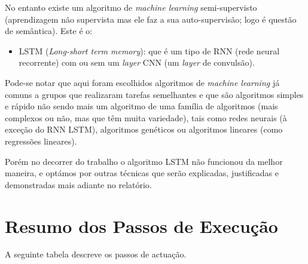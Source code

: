 No entanto existe um algoritmo de \textit{machine learning} semi-supervisto (aprendizagem não supervista mas ele faz a sua auto-supervisão; logo é questão de semântica).
Este é o:
\begin{itemize}
  \setlength\itemsep{0.05em}
  \item LSTM (\textit{Long-short term memory}): que é um tipo de RNN (rede neural recorrente) com ou sem um \textit{layer} CNN (um \textit{layer} de convulsão).
\end{itemize}

Pode-se notar que aqui foram escolhidos algoritmos de \textit{machine learning} já comuns a grupos que realizaram tarefas semelhantes e que são algoritmos simples e rápido não sendo mais um algoritmo de uma família de algoritmos (mais complexos ou não, mas que têm muita variedade), tais como redes neurais (à exceção do RNN LSTM), algoritmos genéticos ou algoritmos lineares (como regressões lineares).

Porém no decorrer do trabalho o algoritmo LSTM não funcionou da melhor maneira, e optámos por outras técnicas que serão explicadas, justificadas e demonstradas mais adiante no relatório.

\newpage
\section{Resumo dos Passos de Execução}

A seguinte tabela descreve os passos de actuação.

\begin{center}
    \label{table:1}
\end{center}